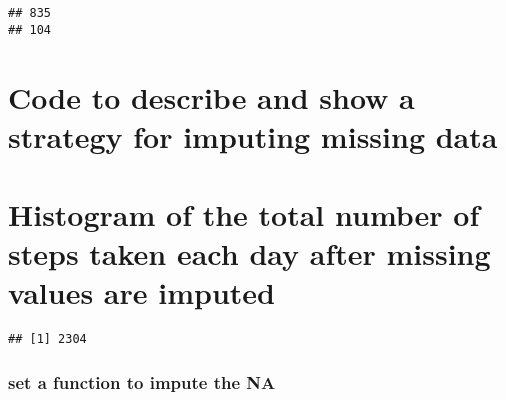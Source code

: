 \documentclass[]{article}
\newenvironment{Shaded}{\begin{snugshade}}{\end{snugshade}}
\newcommand{\KeywordTok}[1]{\textcolor[rgb]{0.13,0.29,0.53}{\textbf{#1}}}
\newcommand{\StringTok}[1]{\textcolor[rgb]{0.31,0.60,0.02}{#1}}
\newcommand{\ControlFlowTok}[1]{\textcolor[rgb]{0.13,0.29,0.53}{\textbf{#1}}}
\newcommand{\OperatorTok}[1]{\textcolor[rgb]{0.81,0.36,0.00}{\textbf{#1}}}
\newcommand{\NormalTok}[1]{#1}
\begin{document}
\begin{verbatim}
## 835 
## 104
\end{verbatim}

\section{Code to describe and show a strategy for imputing missing
data}\label{code-to-describe-and-show-a-strategy-for-imputing-missing-data}

\begin{Shaded}
\end{Shaded}

\section{Histogram of the total number of steps taken each day after
missing values are
imputed}\label{histogram-of-the-total-number-of-steps-taken-each-day-after-missing-values-are-imputed}

\begin{Shaded}
\end{Shaded}

\begin{verbatim}
## [1] 2304
\end{verbatim}

\subsubsection{set a function to impute the
NA}\label{set-a-function-to-impute-the-na}

\begin{Shaded}
\end{Shaded}
\end{document}
